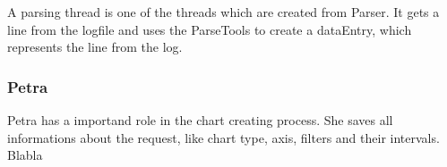 A parsing thread is one of the threads which are created from Parser. It gets a line from the logfile and uses the ParseTools
to create a dataEntry, which represents the line from the log. 

\subsubsection*{Petra}
Petra has a importand role in the chart creating process. She saves all informations about the request,
like chart type, axis, filters and their intervals. Blabla
